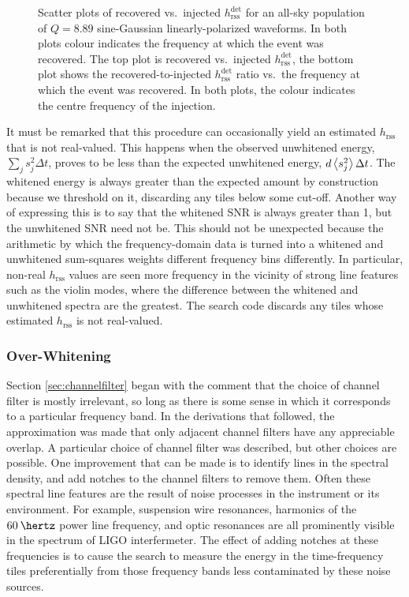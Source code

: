 \documentclass[10pt]{article}
\begin{document}
\begin{figure}
\begin{center}
\end{center}
\caption{Scatter plots of recovered vs.\ injected
\(h_{\text{rss}}^{\text{det}}\) for an all-sky population of \(Q = 8.89\)
sine-Gaussian linearly-polarized waveforms.  In both plots colour indicates
the frequency at which the event was recovered.  The top plot is recovered
vs.\ injected \(h_{\text{rss}}^{\text{det}}\), the bottom plot shows the
recovered-to-injected \(h_{\text{rss}}^{\text{det}}\) ratio vs.\ the
frequency at which the event was recovered.  In both plots, the colour
indicates the centre frequency of the injection.}
\label{fig:h_rec_vs_inj}
\end{figure}

It must be remarked that this procedure can occasionally yield an estimated
\(h_{\text{rss}}\) that is not real-valued.  This happens when the observed
unwhitened energy, \(\sum_{j} s_{j}^{2} \Delta t\), proves to be less than
the expected unwhitened energy, \(d \left\langle s_{j}^{2}\right\rangle \Delta t\).  The
whitened energy is always greater than the expected amount by construction
because we threshold on it, discarding any tiles below some cut-off.
Another way of expressing this is to say that the whitened SNR is always
greater than 1, but the unwhitened SNR need not be.  This should not be
unexpected because the arithmetic by which the frequency-domain data is
turned into a whitened and unwhitened sum-squares weights different
frequency bins differently.  In particular, non-real \(h_{\text{rss}}\)
values are seen more frequency in the vicinity of strong line features such
as the violin modes, where the difference between the whitened and
unwhitened spectra are the greatest.  The search code discards any tiles
whose estimated \(h_{\text{rss}}\) is not real-valued.


\subsubsection{Over-Whitening}


Section \ref{sec:channelfilter} began with the comment that the choice of
channel filter is mostly irrelevant, so long as there is some sense in
which it corresponds to a particular frequency band.  In the derivations
that followed, the approximation was made that only adjacent channel
filters have any appreciable overlap.  A particular choice of channel
filter was described, but other choices are possible.  One improvement that
can be made is to identify lines in the spectral density, and add notches
to the channel filters to remove them.  Often these spectral line features
are the result of noise processes in the instrument or its environment.
For example, suspension wire resonances, harmonics of the
\(\unit{60}{\hertz}\) power line frequency, and optic resonances are all
prominently visible in the spectrum of LIGO interfermeter.  The effect of
adding notches at these frequencies is to cause the search to measure the
energy in the time-frequency tiles preferentially from those frequency
bands less contaminated by these noise sources.
\end{document}
